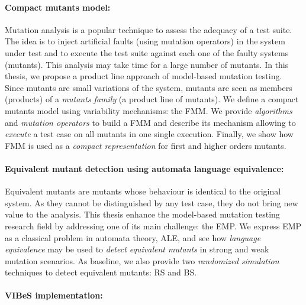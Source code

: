 \paragraph{Compact mutants model:}


Mutation analysis is a popular technique to assess the adequacy of a test suite. The idea is to inject artificial faults (using mutation operators) in the system under test and to execute the test suite against each one of the faulty systems (\ie mutants). This analysis may take time for a large number of mutants. In this thesis, we propose a product line approach of model-based mutation testing. Since mutants are small variations of the system, mutants are seen as members (\ie products) of a \emph{mutants family} (\ie a product line of mutants). We define a compact mutants model using variability mechanisms: the \gls{FMM}. We provide \emph{algorithms} and \emph{mutation operators} to build a \gls{FMM} and describe its mechanism allowing to \emph{execute} a test case on all mutants in one single execution. Finally, we show how \gls{FMM} is used as a \emph{compact representation} for first and higher orders mutants.


\paragraph{Equivalent mutant detection using automata language equivalence:}

   

Equivalent mutants are mutants whose behaviour is identical to the original system. As they cannot be distinguished by any test case, they do not bring new value to the analysis. This thesis enhance the model-based mutation testing research field by addressing one of its main challenge: the \gls{EMP}. We express \gls{EMP} as a classical problem in automata theory, \gls{ALE}, and see how \emph{language equivalence} may be used to \emph{detect equivalent mutants} in strong and weak mutation scenarios. As baseline, we also provide two \emph{randomized simulation} techniques to detect equivalent mutants: \gls{RS} and \gls{BS}.


\paragraph{VIBeS implementation:}

